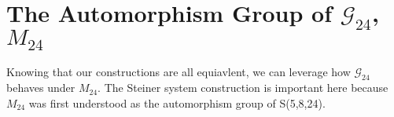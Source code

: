 \documentclass[paper=a4, fontsize=11pt]{scrartcl} %
\numberwithin{equation}{section} %
\numberwithin{figure}{section} %
\numberwithin{table}{section} %
\begin{document}
\section{The Automorphism Group of $\mathcal{G}_{24}$, $M_{24}$}
Knowing that our constructions are all equiavlent, we can leverage how $\mathcal{G}_{24}$ behaves under $M_{24}$. The Steiner system construction is important here because $M_{24}$ was first understood as the automorphism group of S(5,8,24).

\clearpage
\printbibliography
\end{document}
